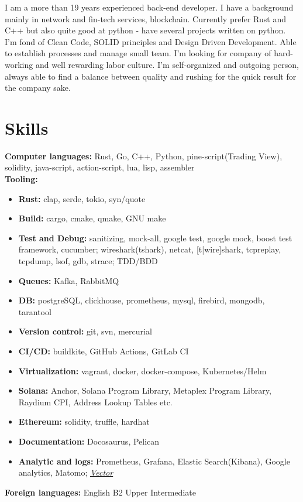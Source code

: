 \documentclass[letterpaper,11pt]{article}
\newcommand{\resumeSubHeadingListStart}{\begin{itemize}[leftmargin=0.15in, label={}]}
\newcommand{\resumeSubHeadingListEnd}{\end{itemize}}
\begin{document}
I am a more than 19 years experienced back-end developer. I have a background mainly in  network and fin-tech services, blockchain. Currently prefer Rust and C++ but also quite good at python - have several projects written on python. I'm fond of Clean Code, SOLID principles and Design Driven Development.
Able to establish processes and manage small team. I'm looking for company of hard-working and well rewarding labor culture. I'm self-organized and outgoing person, always able to find a balance between quality and rushing for the quick result for the company sake.


\section{Skills}
  \vspace{3pt}
  \resumeSubHeadingListStart
    \small{\item{
        \textbf{Computer languages:}{ Rust, Go, C++, Python, pine-script(Trading View), solidity, java-script, action-script, lua, lisp, assembler } \\
        \textbf{Tooling: }\begin{itemize}[topsep=0pt,itemsep=0.1pt]
            \item\textbf{Rust: }{ clap, serde, tokio, syn/quote }
            \item\textbf{Build: }{ cargo, cmake, qmake, GNU make}
            \item\textbf{Test and Debug: }{ sanitizing, mock-all, google test, google mock, boost test framework, cucumber; wireshark(tshark), netcat, [t|wire]shark, tcpreplay, tcpdump, lsof, gdb, strace; TDD/BDD }
            \item\textbf{Queues: }{Kafka, RabbitMQ}
            \item\textbf{DB: }{postgreSQL, clickhouse, prometheus, mysql, firebird, mongodb, tarantool }
            \item\textbf{Version control: }{git, svn, mercurial}
            \item\textbf{CI/CD: }{buildkite, GitHub Actions, GitLab CI}
            \item\textbf{Virtualization: }{vagrant, docker, docker-compose, Kubernetes/Helm}
            \item\textbf{Solana: }{Anchor, Solana Program Library, Metaplex Program Library, Raydium CPI, Address Lookup Tables etc.}
            \item\textbf{Ethereum: }{solidity, truffle, hardhat}
            \item\textbf{Documentation: }{ Docosaurus, Pelican }
            \item\textbf{Analytic and logs: }{ Prometheus, Grafana, Elastic Search(Kibana), Google analytics, Matomo; \emph{\href{https://vector.dev/}{\color{blue}Vector}} }
        \end{itemize}
        \textbf{Foreign languages:}{ English B2 Upper Intermediate } 
    }}
  \resumeSubHeadingListEnd
\end{document}
